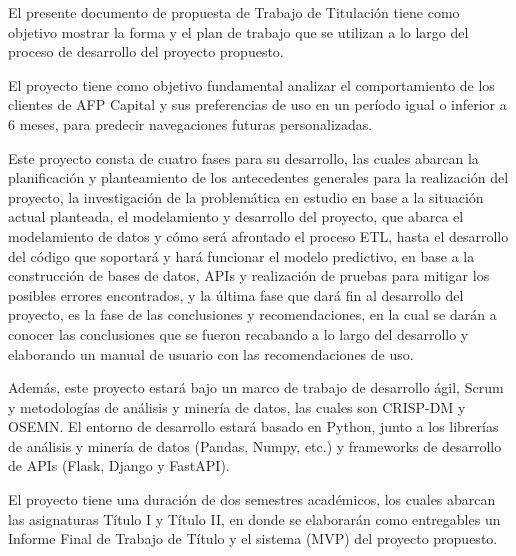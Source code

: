 El presente documento de propuesta de Trabajo de Titulación tiene como objetivo mostrar la forma y el plan de trabajo que se utilizan a lo largo del proceso de desarrollo del proyecto propuesto.

El proyecto tiene como objetivo fundamental analizar el comportamiento de los clientes de AFP Capital y sus preferencias de uso en un período igual o inferior a 6 meses, para predecir navegaciones futuras personalizadas.

Este proyecto consta de cuatro fases para su desarrollo, las cuales abarcan la planificación y planteamiento de los antecedentes generales para la realización del proyecto, la investigación de la problemática en estudio en base a la situación actual planteada, el modelamiento y desarrollo del proyecto, que abarca el modelamiento de datos y cómo será afrontado el proceso ETL, hasta el desarrollo del código que soportará y hará funcionar el modelo predictivo, en base a la construcción de bases de datos, APIs y realización de pruebas para mitigar los posibles errores encontrados, y la última fase que dará fin al desarrollo del proyecto, es la fase de las conclusiones y recomendaciones, en la cual se darán a conocer las conclusiones que se fueron recabando a lo largo del desarrollo y elaborando un manual de usuario con las recomendaciones de uso.

Además, este proyecto estará bajo un marco de trabajo de desarrollo ágil, Scrum y metodologías de análisis y minería de datos, las cuales son CRISP-DM y OSEMN. El entorno de desarrollo estará basado en Python, junto a los librerías de análisis y minería de datos (Pandas, Numpy, etc.) y frameworks de desarrollo de APIs (Flask, Django y FastAPI).

El proyecto tiene una duración de dos semestres académicos, los cuales abarcan las asignaturas Título I y Título II, en donde se elaborarán como entregables un Informe Final de Trabajo de Título y el sistema (MVP) del proyecto propuesto.